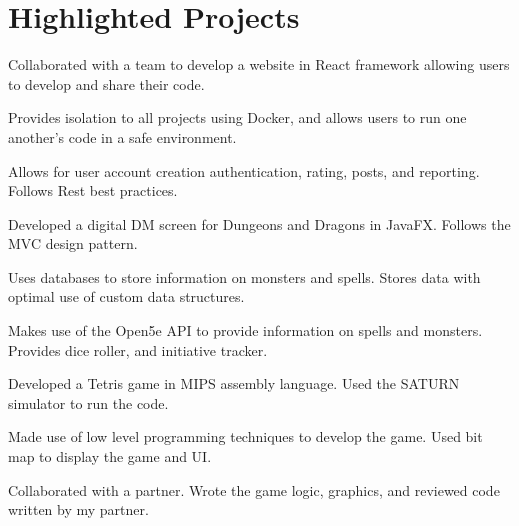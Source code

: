 \documentclass[letterpaper,10pt]{article}
\begin{document}

    \section{Highlighted Projects}

    \begin{resume_list}
        \item Collaborated with a team to develop a website in React framework allowing users to develop and share their code.
        \item Provides isolation to all projects using Docker, and allows users to run one another's code in a safe environment.
        \item Allows for user account creation authentication, rating, posts, and reporting. Follows Rest best practices.
    \end{resume_list}
    \begin{resume_list}
        \item Developed a digital DM screen for Dungeons and Dragons in JavaFX. Follows the MVC design pattern.
        \item Uses databases to store information on monsters and spells. Stores data with optimal use of custom data structures.
        \item Makes use of the Open5e API to provide information on spells and monsters. Provides dice roller, and initiative tracker.
        
    \end{resume_list}
    \begin{resume_list}
        \item Developed a Tetris game in MIPS assembly language. Used the SATURN simulator to run the code.
        \item Made use of low level programming techniques to develop the game. Used bit map to display the game and UI.
        \item Collaborated with a partner. Wrote the game logic, graphics, and reviewed code written by my partner.
    \end{resume_list}
\end{document}
